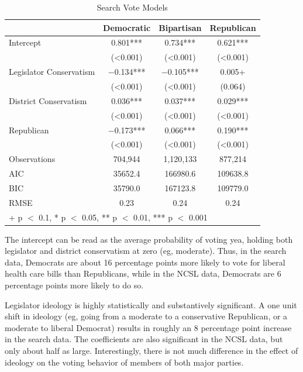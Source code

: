 \documentclass[
  oneside]{book}
\begin{document}
\begin{table}

\caption{\label{tab:votemodel-all}Search Vote Models}
\centering
\begin{tabular}[t]{lccc}
\toprule
  & Democratic & Bipartisan & Republican\\
\midrule
Intercept & \num{0.801}*** & \num{0.734}*** & \num{0.621}***\\
 & (\num{<0.001}) & (\num{<0.001}) & \vphantom{2} (\num{<0.001})\\
Legislator Conservatism & \num{-0.134}*** & \num{-0.105}*** & \num{0.005}+\\
 & (\num{<0.001}) & (\num{<0.001}) & (\num{0.064})\\
District Conservatism & \num{0.036}*** & \num{0.037}*** & \num{0.029}***\\
 & (\num{<0.001}) & (\num{<0.001}) & \vphantom{1} (\num{<0.001})\\
Republican & \num{-0.173}*** & \num{0.066}*** & \num{0.190}***\\
 & (\num{<0.001}) & (\num{<0.001}) & (\num{<0.001})\\
Observations & 704,944 & 1,120,133 & 877,214\\
\midrule
AIC & \num{35652.4} & \num{166980.6} & \num{109638.8}\\
BIC & \num{35790.0} & \num{167123.8} & \num{109779.0}\\
RMSE & \num{0.23} & \num{0.24} & \num{0.24}\\
\bottomrule
\multicolumn{4}{l}{\rule{0pt}{1em}+ p $<$ 0.1, * p $<$ 0.05, ** p $<$ 0.01, *** p $<$ 0.001}\\
\end{tabular}
\end{table}

The intercept can be read as the average probability of voting yea, holding both legislator and district conservatism at zero (eg, moderate). Thus, in the search data, Democrats are about 16 percentage points more likely to vote for liberal health care bills than Republicans, while in the NCSL data, Democrats are 6 percentage points more likely to do so.

Legislator ideology is highly statistically and substantively significant. A one unit shift in ideology (eg, going from a moderate to a conservative Republican, or a moderate to liberal Democrat) results in roughly an 8 percentage point increase in the search data. The coefficients are also significant in the NCSL data, but only about half as large. Interestingly, there is not much difference in the effect of ideology on the voting behavior of members of both major parties.
\end{document}
